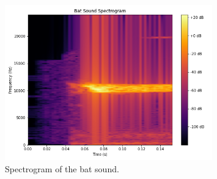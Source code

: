 \documentclass[12pt]{article}
\begin{document}
\begin{figure}[h]
    \centering
    \includegraphics[width=0.8\textwidth]{spectrogram.png}
    \caption{Spectrogram of the bat sound.}
    \label{fig:spectrogram}
\end{figure}
\end{document}
